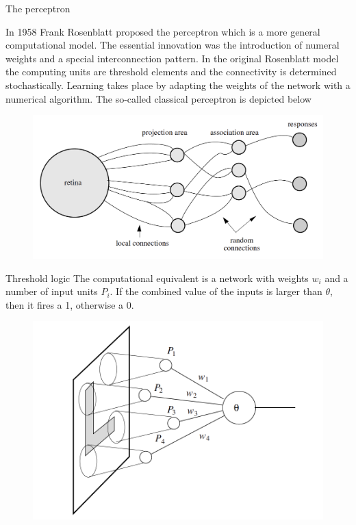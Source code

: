 \documentclass[11pt, aspectratio=43]{beamer}
\begin{document}
\begin{frame}{The perceptron}
	
	In 1958 Frank Rosenblatt proposed the perceptron which is a more general computational model. The essential innovation was the introduction of numeral weights and a special interconnection pattern. In the original Rosenblatt model the computing units are threshold elements and the connectivity is determined stochastically. Learning takes place by adapting the weights of the network with a numerical algorithm. The so-called classical perceptron is depicted below
	
			\begin{figure}[h]
		\centering
		\includegraphics[scale=0.4]{Figures/nn_3.1.png}
	\end{figure}	
	
	
\end{frame}

\begin{frame}{Threshold logic}
	The computational equivalent is a network with weights $w_i$ and a number of input units $P_i$. If the combined value of the inputs is larger than $\theta$, then it fires a 1, otherwise a 0.

			\begin{figure}[h]
	\centering
	\includegraphics[scale=0.4]{Figures/nn_3.2.png}
\end{figure}	
	
	
\end{frame}
\end{document}
